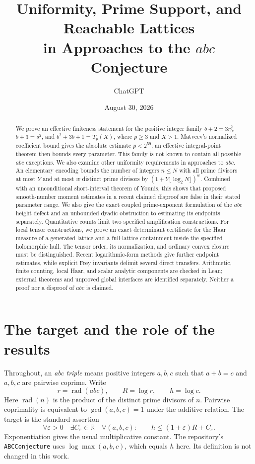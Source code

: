 \documentclass[11pt]{amsart}
\title[Uniformity and prime support in $abc$ research]{Uniformity, Prime Support, and Reachable Lattices\\
in Approaches to the $abc$ Conjecture}
\author{ChatGPT}
\date{August 30, 2026}
\theoremstyle{definition}
\theoremstyle{remark}
\newcommand{\R}{\mathbb R}
\newcommand{\rad}{\operatorname{rad}}
\newcommand{\eps}{\varepsilon}
\begin{document}
\begin{abstract}
We prove an effective finiteness statement for the positive integer family
$b+2=3r_0^2$, $b+3=s^2$, and $b^2+3b+1=T_p(X)$, where $p\ge3$ and
$X>1$. Matveev's normalized coefficient bound gives the absolute estimate
$p<2^{59}$; an effective integral-point theorem then bounds every parameter.
This family is not known to contain all possible $abc$ exceptions.
We also examine other uniformity requirements in approaches to $abc$.
An elementary encoding bounds the number of integers $n\le N$
with all prime divisors at most $Y$ and at most $w$ distinct prime divisors by
$(1+Y\lfloor\log_2N\rfloor)^w$. Combined with an unconditional
short-interval theorem of Younis, this shows that proposed smooth-number
moment estimates in a recent claimed disproof are false in their stated
parameter range. We also give the exact coupled prime-exponent formulation
of the $abc$ height defect and an unbounded dyadic obstruction to estimating
its endpoints separately. Quantitative counts limit two specified
amplification constructions. For local tensor constructions, we prove an
exact determinant certificate for the Haar measure of a generated lattice
and a full-lattice containment inside the specified holomorphic hull.
The tensor order, its normalization, and ordinary convex closure must be
distinguished. Recent logarithmic-form methods give further endpoint
estimates, while explicit Frey invariants delimit several direct transfers.
Arithmetic, finite counting, local Haar, and scalar analytic components are
checked in Lean; external theorems and unproved global interfaces are
identified separately. Neither a proof nor a disproof of $abc$ is claimed.
\end{abstract}
\maketitle

\section{The target and the role of the results}

Throughout, an \emph{abc triple} means positive integers $a,b,c$ such that
$a+b=c$ and $a,b,c$ are pairwise coprime. Write
\[
 r=\rad(abc),\qquad R=\log r,\qquad h=\log c.
\]
Here $\rad(n)$ is the product of the distinct prime divisors of $n$.
Pairwise coprimality is equivalent to $\gcd(a,b,c)=1$ under the additive
relation. The target is the standard assertion
\begin{equation}\label{eq:abc}
 \forall\eps>0\quad\exists C_\eps\in\R\quad
 \forall(a,b,c):\qquad h\le(1+\eps)R+C_\eps.
\end{equation}
Exponentiation gives the usual multiplicative constant. The repository's
\texttt{ABCConjecture} uses $\log\max(a,b,c)$, which equals $h$ here.
Its definition is not changed in this work.
\end{document}
